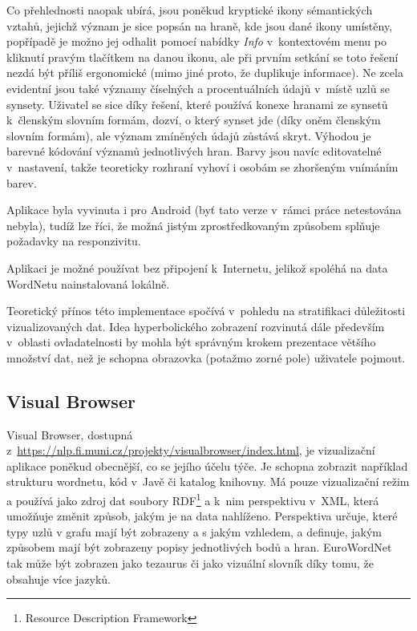 \documentclass[a4paper, 11pt, oneside, showtrims]{book}
\begin{document}
					Co přehlednosti naopak ubírá, jsou poněkud kryptické ikony sémantických vztahů, jejichž význam je sice popsán na hraně, kde jsou dané ikony umístěny, popřípadě je možno jej odhalit pomocí nabídky \textit{Info} v~kontextovém menu po kliknutí pravým tlačítkem na danou ikonu, ale při prvním setkání se toto řešení nezdá být příliš ergonomické (mimo jiné proto, že duplikuje informace). Ne zcela evidentní jsou také významy číselných a procentuálních údajů v~místě uzlů se synsety. Uživatel se sice díky řešení, které používá konexe hranami ze synsetů k~členským slovním formám, dozví, o který synset jde (díky oněm členským slovním formám), ale význam zmíněných údajů zůstává skryt. Výhodou je barevné kódování významů jednotlivých hran. Barvy jsou navíc editovatelné v~nastavení, takže teoreticky rozhraní vyhoví i osobám se zhoršeným vnímáním barev.

					Aplikace byla vyvinuta i pro Android (byť tato verze v~rámci práce netestována nebyla), tudíž lze říci, že možná jistým zprostředkovaným způsobem splňuje požadavky na responzivitu.

					Aplikaci je možné používat bez připojení k~Internetu, jelikož spoléhá na data WordNetu nainstalovaná lokálně.

					Teoretický přínos této implementace spočívá v~pohledu na stratifikaci důležitosti vizualizovaných dat. Idea hyperbolického zobrazení rozvinutá dále především v~oblasti ovladatelnosti by mohla být správným krokem prezentace většího množství dat, než je schopna obrazovka (potažmo zorné pole) uživatele pojmout.

				\subsection{Visual Browser}

					Visual Browser, dostupná z~\url{https://nlp.fi.muni.cz/projekty/visualbrowser/index.html}, je vizualizační aplikace poněkud obecnější, co se jejího účelu týče. Je schopna zobrazit například strukturu wordnetu, kód v~Javě či katalog knihovny. Má pouze vizualizační režim a používá jako zdroj dat soubory RDF\footnote{Resource Description Framework} a k~nim perspektivu v~XML, která umožňuje změnit způsob, jakým je na data nahlíženo. Perspektiva určuje, které typy uzlů v grafu mají být zobrazeny a s jakým vzhledem, a definuje, jakým způsobem mají být zobrazeny popisy jednotlivých bodů a hran. EuroWordNet tak může být zobrazen jako tezaurus či jako vizuální slovník díky tomu, že obsahuje více jazyků. \parencite{visualbrowser595310} 
\end{document}
